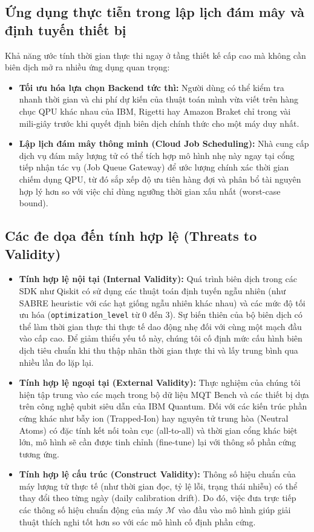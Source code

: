 \documentclass[11pt, a4paper]{article}
\begin{document}
\subsection{Ứng dụng thực tiễn trong lập lịch đám mây và định tuyến thiết bị}
Khả năng ước tính thời gian thực thi ngay ở tầng thiết kế cấp cao mà không cần biên dịch mở ra nhiều ứng dụng quan trọng:
\begin{itemize}
    \item \textbf{Tối ưu hóa lựa chọn Backend tức thì:} Người dùng có thể kiểm tra nhanh thời gian và chi phí dự kiến của thuật toán mình vừa viết trên hàng chục QPU khác nhau của IBM, Rigetti hay Amazon Braket chỉ trong vài mili-giây trước khi quyết định biên dịch chính thức cho một máy duy nhất.
    \item \textbf{Lập lịch đám mây thông minh (Cloud Job Scheduling):} Nhà cung cấp dịch vụ đám mây lượng tử có thể tích hợp mô hình nhẹ này ngay tại cổng tiếp nhận tác vụ (Job Queue Gateway) để ước lượng chính xác thời gian chiếm dụng QPU, từ đó sắp xếp độ ưu tiên hàng đợi và phân bổ tài nguyên hợp lý hơn so với việc chỉ dùng ngưỡng thời gian xấu nhất (worst-case bound).
\end{itemize}

\subsection{Các đe dọa đến tính hợp lệ (Threats to Validity)}
\begin{itemize}
    \item \textbf{Tính hợp lệ nội tại (Internal Validity):} Quá trình biên dịch trong các SDK như Qiskit có sử dụng các thuật toán định tuyến ngẫu nhiên (như SABRE heuristic với các hạt giống ngẫu nhiên khác nhau) và các mức độ tối ưu hóa (\texttt{optimization\_level} từ 0 đến 3). Sự biến thiên của bộ biên dịch có thể làm thời gian thực thi thực tế dao động nhẹ đối với cùng một mạch đầu vào cấp cao. Để giảm thiểu yếu tố này, chúng tôi cố định mức cấu hình biên dịch tiêu chuẩn khi thu thập nhãn thời gian thực thi và lấy trung bình qua nhiều lần đo lặp lại.
    \item \textbf{Tính hợp lệ ngoại tại (External Validity):} Thực nghiệm của chúng tôi hiện tập trung vào các mạch trong bộ dữ liệu MQT Bench và các thiết bị dựa trên công nghệ qubit siêu dẫn của IBM Quantum. Đối với các kiến trúc phần cứng khác như bẫy ion (Trapped-Ion) hay nguyên tử trung hòa (Neutral Atoms) có đặc tính kết nối toàn cục (all-to-all) và thời gian cổng khác biệt lớn, mô hình sẽ cần được tinh chỉnh (fine-tune) lại với thông số phần cứng tương ứng.
    \item \textbf{Tính hợp lệ cấu trúc (Construct Validity):} Thông số hiệu chuẩn của máy lượng tử thực tế (như thời gian đọc, tỷ lệ lỗi, trạng thái nhiễu) có thể thay đổi theo từng ngày (daily calibration drift). Do đó, việc đưa trực tiếp các thông số hiệu chuẩn động của máy $\mathcal{M}$ vào đầu vào mô hình giúp giải thuật thích nghi tốt hơn so với các mô hình cố định phần cứng.
\end{itemize}
\end{document}
